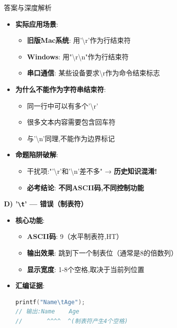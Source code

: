\documentclass[a4paper,12pt]{article}
\begin{document}
\begin{bluebox}{答案与深度解析}
\begin{itemize}[leftmargin=*, nosep]
		\item \textbf{实际应用场景}:
		      \begin{itemize}
			      \item \textbf{旧版Mac系统}: 用'\textbackslash r'作为行结束符
			      \item \textbf{Windows}: 用"\textbackslash r\textbackslash n"作为行结束符
			      \item \textbf{串口通信}: 某些设备要求\textbackslash r作为命令结束标志
		      \end{itemize}

		\item \textbf{为什么不能作为字符串结束符}:
		      \begin{itemize}
			      \item 同一行中可以有多个'\textbackslash r'
			      \item 很多文本内容需要包含回车符
			      \item 与'\textbackslash n'同理,不能作为边界标记
		      \end{itemize}

		\item \textbf{命题陷阱破解}:
		      \begin{itemize}
			      \item 干扰项:"'\textbackslash r'和'\textbackslash n'差不多" → \textbf{历史知识混淆!}
			      \item \textbf{必考结论}: \textbf{不同ASCII码,不同控制功能}
		      \end{itemize}
	\end{itemize}

	\textbf{D) '\texttt{\textbackslash t}' — 错误（制表符）}
	\begin{itemize}[leftmargin=*, nosep]
		\item \textbf{核心功能}:
		      \begin{itemize}
			      \item \textbf{ASCII码}: 9（水平制表符,HT）
			      \item \textbf{输出效果}: 跳到下一个制表位（通常是8的倍数列）
			      \item \textbf{显示宽度}: 1-8个空格,取决于当前列位置
		      \end{itemize}

		\item \textbf{汇编证据}:
		      \begin{lstlisting}[language=C]
printf("Name\tAge");
// 输出:Name    Age
//       ^^^^  ^(制表符产生4个空格)
    \end{lstlisting}


\end{itemize}
\end{bluebox}
\end{document}

